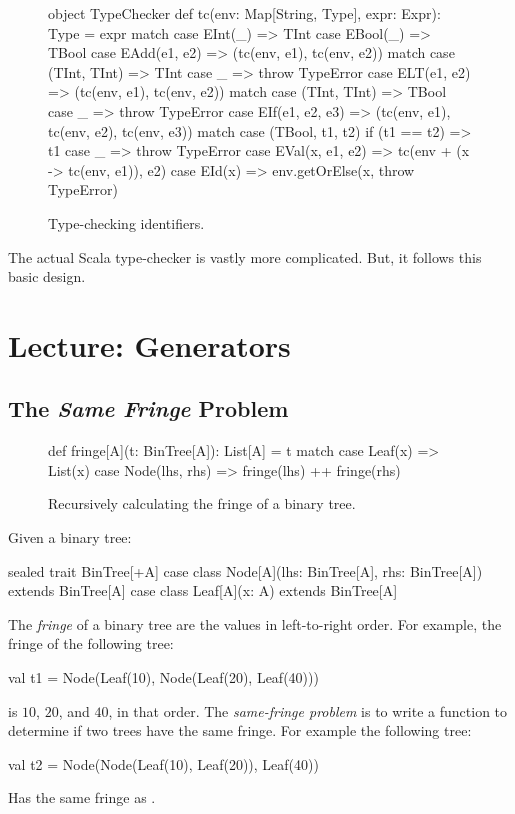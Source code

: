 \documentclass[9pt]{extbook}
\begin{document}
\begin{figure}
\begin{scalacode}
object TypeChecker {
  def tc(env: Map[String, Type], expr: Expr): Type = expr match {
    case EInt(_) => TInt
    case EBool(_) => TBool
    case EAdd(e1, e2) => (tc(env, e1), tc(env, e2)) match {
      case (TInt, TInt) => TInt
      case _ => throw TypeError
    }
    case ELT(e1, e2) => (tc(env, e1), tc(env, e2)) match {
      case (TInt, TInt) => TBool
      case _ => throw TypeError
    }
    case EIf(e1, e2, e3) => (tc(env, e1), tc(env, e2), tc(env, e3)) match {
      case (TBool, t1, t2) if (t1 == t2) => t1
      case _ => throw TypeError
    }
    case EVal(x, e1, e2) => tc(env + (x -> tc(env, e1)), e2)
    case EId(x) => env.getOrElse(x, throw TypeError)
  }
}
\end{scalacode}
\caption{Type-checking identifiers.}\label{tcid}
\end{figure}

The actual Scala type-checker is vastly more complicated. But, it follows
this basic design.


\chapter{Lecture: Generators}

\section{The \emph{Same Fringe} Problem}



\begin{figure}
\begin{scalacode}
def fringe[A](t: BinTree[A]): List[A] = t match { case Leaf(x) =>
  List(x) case Node(lhs, rhs) => fringe(lhs) ++ fringe(rhs) }
\end{scalacode}
\caption{Recursively calculating the fringe of a binary tree.}
\label{fringeRec}
\end{figure}

Given a binary tree:

\begin{scalacode}
sealed trait BinTree[+A]
case class Node[A](lhs: BinTree[A], rhs: BinTree[A]) extends BinTree[A]
case class Leaf[A](x: A) extends BinTree[A]
\end{scalacode}

The \emph{fringe} of a binary tree are the values in left-to-right order. For
example, the fringe of the following tree:
\begin{scalacode}
val t1 = Node(Leaf(10), Node(Leaf(20), Leaf(40)))
\end{scalacode}
is $10$, $20$, and $40$, in that order. The \emph{same-fringe problem} is to write
a function to determine if two trees have the same fringe. For
example the following tree:
%
\begin{scalacode}
val t2 = Node(Node(Leaf(10), Leaf(20)), Leaf(40))
\end{scalacode}
Has the same fringe as .
\end{document}

